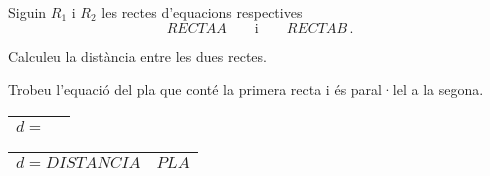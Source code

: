 \begin{enunciat}
Siguin $R_1$ i $R_2$ les rectes d'equacions respectives
\[
  RECTAA\qquad\text{i}\qquad RECTAB\,.
\]
\begin{apartats}
\item Calculeu la distància entre les dues rectes.
\item Trobeu l'equació del pla que conté la primera recta i és paral·lel a la segona. 
\end{apartats}
\end{enunciat}

\begin{quadricula}
\begin{tabular}{|L{5cm}{0.8cm}|L{7cm}{0.8cm}|}
\hline
$d=$ & \\ 
\hline
\end{tabular}
\end{quadricula}

\begin{solucio}
\begin{center}
\begin{tabular}{|L{5cm}{0.8cm}|C{7cm}{0.8cm}|}
\hline
$d=\displaystyle DISTANCIA$ & $PLA$ \\
\hline
\end{tabular}
\end{center}
\end{solucio}



